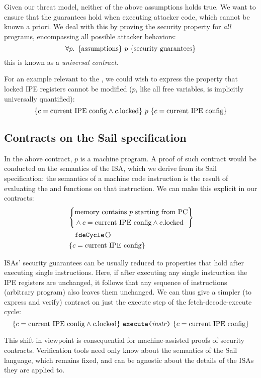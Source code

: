 Given our threat model, neither of the above assumptions holds true. We want to ensure that the guarantees hold when executing attacker code, which cannot be known a priori. We deal with this by proving the security property for \emph{all} programs, encompassing all possible attacker behaviors:
\[ \forall p.\; \hoare{\text{assumptions}}{p}{\text{security guarantees}} \]
this is known as a \emph{universal contract}.

For an example relevant to the \msp, we could wish to express the property that locked IPE registers cannot be modified (\(p\), like all free variables, is implicitly universally quantified):
\[ \hoare
  {c = \text{current IPE config} \wedge c.\mathrm{locked}}
  {p}
  {c = \text{current IPE config}} \]

\subsection{Contracts on the Sail specification}

In the above contract, \(p\) is a \msp machine program. A proof of such contract would be conducted on the semantics of the \msp ISA, which we derive from its Sail specification: the semantics of a machine code instruction is the result of evaluating the  and  functions on that instruction. We can make this explicit in our contracts:
\[ \hoarem
  {\begin{aligned}
    &\text{memory contains \(p\) starting from PC} \\
    &{}\wedge c = \text{current IPE config} \wedge c.\mathrm{locked}
  \end{aligned}}
  {\texttt{fdeCycle()}}
  {c = \text{current IPE config}} \]

ISAs' security guarantees can be usually reduced to properties that hold after executing single instructions. Here, if after executing any single instruction the IPE registers are unchanged, it follows that any sequence of instructions (\ie arbitrary program) also leaves them unchanged. We can thus give a simpler (to express and verify) contract on just the execute step of the fetch-decode-execute cycle:
\[ \hoare
  {c = \text{current IPE config} \wedge c.\mathrm{locked}}
  {\texttt{execute(\(\mathit{instr}\))}}
  {c = \text{current IPE config}} \]

This shift in viewpoint is consequential for machine-assisted proofs of security contracts. Verification tools need only know about the semantics of the Sail language, which remains fixed, and can be agnostic about the details of the ISAs they are applied to.

